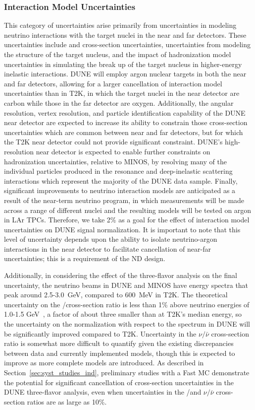 \subsubsection{Interaction Model Uncertainties}
\label{sec:syst_just_sim}
This category of uncertainties arise primarily from uncertainties in modeling neutrino interactions with the target
nuclei in the near and far detectors. These uncertainties include \nue and \numu cross-section uncertainties,
uncertainties from modeling the structure of the target nucleus, and the impact of
hadronization model uncertainties in simulating the break up of the target nucleus in higher-energy inelastic
interactions. DUNE will employ argon nuclear targets in both the near and far detectors, allowing for a larger
cancellation of interaction model uncertainties than in T2K, in which the target nuclei in the near detector are
carbon while those in the far detector are oxygen. Additionally, the angular resolution, vertex resolution,
and particle identification capability of the DUNE near detector are expected to increase its ability to
constrain those cross-section uncertainties which are common between near and far detectors, but for which
the T2K near detector could not provide significant constraint. DUNE's high-resolution near
detector is expected to enable further constraints on hadronization uncertainties, relative to MINOS, by
resolving many of the individual particles produced in the resonance and deep-inelastic scattering interactions
which represent the majority of the DUNE data sample. Finally, significant improvements to neutrino interaction
models are anticipated as a result of the near-term neutrino program, in which measurements will be made
across a range of different nuclei and the resulting models will be tested on argon in LAr TPCs.
Therefore, we take 2\% as a goal for the effect of
interaction model uncertainties on DUNE \nue signal normalization. It is important to note that this level of
uncertainty depends upon the ability to isolate neutrino-argon interactions in the near detector to facilitate
cancellation of near-far uncertainties; this is a requirement of the ND design.

Additionally, in considering the effect of the three-flavor analysis on the final uncertainty,
the neutrino beams in DUNE and MINOS have energy
spectra that peak around 2.5-3.0~GeV, compared to 600~MeV in T2K. 
The theoretical uncertainty on the \nue/\numu cross-section ratio is
less than 1\% above neutrino energies of 1.0-1.5 GeV~\cite{Day-McFarland:2012},
a factor of about three smaller than at T2K's median energy,
so the uncertainty on the \nue normalization with respect to the \numu spectrum in DUNE will be
significantly improved compared to T2K. Uncertainty in the $\nu/\bar{\nu}$ cross-section ratio is
somewhat more difficult to quantify given the existing discrepancies between data and currently
implemented models, though this is expected to improve as more complete models are introduced.
As described in Section~\ref{sec:syst_studies_ind}, preliminary studies with a
Fast MC demonstrate the potential for significant cancellation of cross-section uncertainties
in the DUNE three-flavor
analysis, even when uncertainties in the \nue/\numu and $\nu/\bar\nu$ cross-section ratios
are as large as 10\%.

